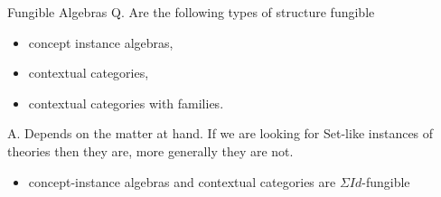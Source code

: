 \begin{frame}{Fungible Algebras}
Q. Are the following types of structure fungible
\begin{itemize}
\item concept instance algebras,
\item contextual categories,
\item contextual categories with families.
\end{itemize}
A. Depends on the matter at hand. If we are looking for Set-like instances of theories then they are, 
more generally they are not.

\begin{itemize}
\item concept-instance algebras and contextual categories are $\Sigma Id$-fungible
\end{itemize}
\end{frame}

